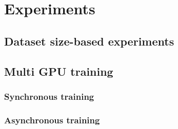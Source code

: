 \chapter{Experiments}
\label{chapter:evaluation}

\section{Dataset size-based experiments}

\section{Multi GPU training}
\subsection{Synchronous training}
\subsection{Asynchronous training}
